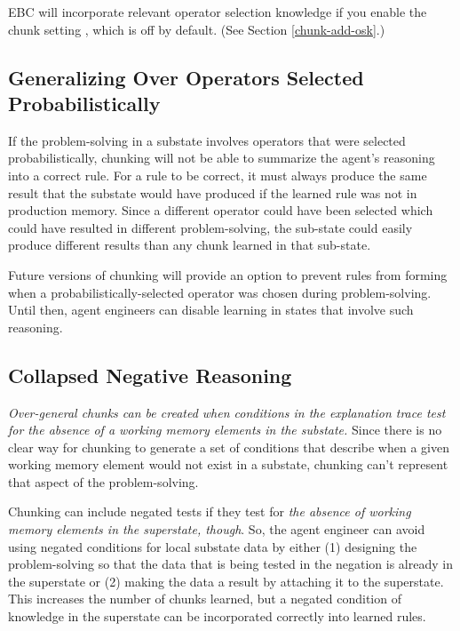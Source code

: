 EBC will incorporate relevant operator selection knowledge if you enable the chunk setting , which is off by default. (See Section \ref{chunk-add-osk}.)

\subsection{Generalizing Over Operators Selected Probabilistically}

If the problem-solving in a substate involves operators that were selected probabilistically, chunking will not be able to summarize the agent's reasoning into a correct rule.  For a rule to be correct, it must always produce the same result that the substate would have produced if the learned rule was not in production memory.  Since a different operator could have been selected which could have resulted in different problem-solving, the sub-state could easily produce different results than any chunk learned in that sub-state.

Future versions of chunking will provide an option to prevent rules from forming when a probabilistically-selected operator was chosen during problem-solving.  Until then, agent engineers can disable learning in states that involve such reasoning.

\subsection{Collapsed Negative Reasoning}

\emph{Over-general chunks can be created when conditions in the explanation trace test for the absence of a working memory elements in the substate.} Since there is no clear way for chunking to generate a set of conditions that describe when a given working memory element would not exist in a substate, chunking can't represent that aspect of the problem-solving. 

Chunking can include negated tests if they test for \textit{the absence of working memory elements in the superstate, though}.  So, the agent engineer can avoid using negated conditions for local substate data by either (1) designing the problem-solving so that the data that is being tested in the negation is already in the superstate or (2) making the data a result by attaching it to the superstate. This increases the number of chunks learned, but a negated condition of knowledge in the superstate can be incorporated correctly into learned rules.

